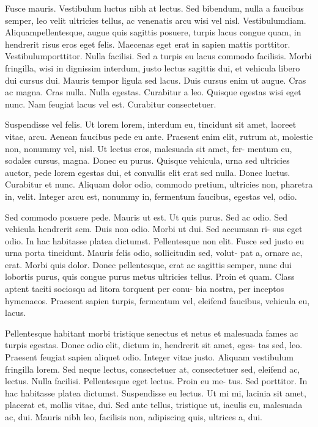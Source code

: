 \documentclass[12pt,a4paper]{article}
\begin{document}
Fusce mauris. Vestibulum luctus nibh at lectus. Sed bibendum, nulla
a faucibus semper, leo velit ultricies tellus, ac venenatis arcu wisi vel nisl.
Vestibulumdiam. Aliquampellentesque, augue quis sagittis posuere, turpis
lacus congue quam, in hendrerit risus eros eget felis. Maecenas eget erat in
sapien mattis porttitor. Vestibulumporttitor. Nulla facilisi. Sed a turpis eu
lacus commodo facilisis. Morbi fringilla, wisi in dignissim interdum, justo
lectus sagittis dui, et vehicula libero dui cursus dui. Mauris tempor ligula
sed lacus. Duis cursus enim ut augue. Cras ac magna. Cras nulla. Nulla
egestas. Curabitur a leo. Quisque egestas wisi eget nunc. Nam feugiat lacus
vel est. Curabitur consectetuer.

Suspendisse vel felis. Ut lorem lorem, interdum eu, tincidunt sit amet,
laoreet vitae, arcu. Aenean faucibus pede eu ante. Praesent enim elit, rutrum
at, molestie non, nonummy vel, nisl. Ut lectus eros, malesuada sit amet, fer-
mentum eu, sodales cursus, magna. Donec eu purus. Quisque vehicula, urna
sed ultricies auctor, pede lorem egestas dui, et convallis elit erat sed nulla.
Donec luctus. Curabitur et nunc. Aliquam dolor odio, commodo pretium,
ultricies non, pharetra in, velit. Integer arcu est, nonummy in, fermentum
faucibus, egestas vel, odio.

Sed commodo posuere pede. Mauris ut est. Ut quis purus. Sed ac odio.
Sed vehicula hendrerit sem. Duis non odio. Morbi ut dui. Sed accumsan ri-
sus eget odio. In hac habitasse platea dictumst. Pellentesque non elit. Fusce
sed justo eu urna porta tincidunt. Mauris felis odio, sollicitudin sed, volut-
pat a, ornare ac, erat. Morbi quis dolor. Donec pellentesque, erat ac sagittis
semper, nunc dui lobortis purus, quis congue purus metus ultricies tellus.
Proin et quam. Class aptent taciti sociosqu ad litora torquent per conu-
bia nostra, per inceptos hymenaeos. Praesent sapien turpis, fermentum vel,
eleifend faucibus, vehicula eu, lacus.

Pellentesque habitant morbi tristique senectus et netus et malesuada
fames ac turpis egestas. Donec odio elit, dictum in, hendrerit sit amet, eges-
tas sed, leo. Praesent feugiat sapien aliquet odio. Integer vitae justo. Aliquam
vestibulum fringilla lorem. Sed neque lectus, consectetuer at, consectetuer
sed, eleifend ac, lectus. Nulla facilisi. Pellentesque eget lectus. Proin eu me-
tus. Sed porttitor. In hac habitasse platea dictumst. Suspendisse eu lectus.
Ut mi mi, lacinia sit amet, placerat et, mollis vitae, dui. Sed ante tellus,
tristique ut, iaculis eu, malesuada ac, dui. Mauris nibh leo, facilisis non,
adipiscing quis, ultrices a, dui.
\end{document}
